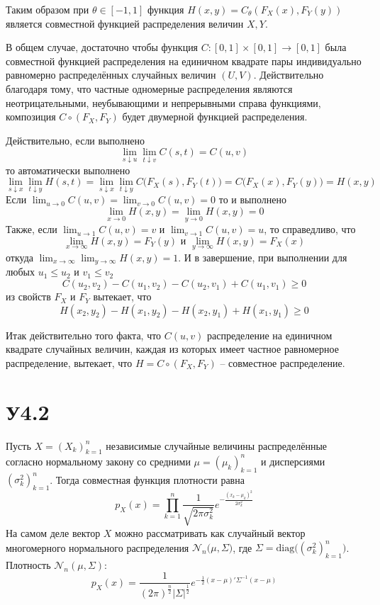 \documentclass[a4paper]{article}
\newcommand{\Ncal}{\mathcal{N}}
\begin{document}
Таким образом при $\theta\in [-1,1]$ функция $H(x,y)=C_\theta(F_X(x),F_Y(y))$
является совместной функцией распределения величин $X,Y$.

В общем случае, достаточно чтобы функция $C:[0,1]\times[0,1]\to[0,1]$ была
совместной функцией распределения на единичном квадрате пары индивидуально
равномерно распределённых случайных величин $(U,V)$. Действительно благодаря
тому, что частные одномерные распределения являются неотрицательными, неубывающими
и непрерывными справа функциями, композиция $C\circ(F_X,F_Y)$ будет двумерной
функцией распределения.

Действительно, если выполнено
\[\lim_{s\downarrow u}\lim_{t\downarrow v} C(s,t) = C(u,v)\]
то автоматически выполнено
\[
\lim_{s\downarrow x}\lim_{t\downarrow y} H(s,t)
= \lim_{s\downarrow x}\lim_{t\downarrow y} C\bigl(F_X(s),F_Y(t)\bigr)
= C\bigl(F_X(x),F_Y(y)\bigr)
= H(x,y)
\]
Если $\lim_{u\to0} C(u,v) = \lim_{v\to0} C(u,v) = 0$ то и выполнено 
\[\lim_{x\to0} H(x,y) = \lim_{y\to0} H(x,y) = 0\]
Также, если $\lim_{u\to1} C(u,v) = v$ и $\lim_{v\to1} C(u,v) = u$, то справедливо,
что
\[\lim_{x\to\infty}H(x,y) = F_Y(y)\text{ и }\lim_{y\to\infty}H(x,y) = F_X(x)\]
откуда $\lim_{x\to\infty}\lim_{y\to\infty}H(x,y) = 1$.
И в завершение, при выполнении для любых $u_1\leq u_2$ и $v_1\leq v_2$
\[C(u_2,v_2) - C(u_1,v_2) - C(u_2,v_1) + C(u_1,v_1)\geq 0\]
из свойств $F_X$ и $F_Y$ вытекает, что
\[H(x_2,y_2) - H(x_1,y_2) - H(x_2,y_1) + H(x_1,y_1)\geq 0\]

Итак действительно того факта, что $C(u,v)$ распределение на единичном квадрате
случайных величин, каждая из которых имеет частное равномерное распределение,
вытекает, что $H=C\circ(F_X,F_Y)$ -- совместное распределение.


\section{У4.2} %
\label{sec:problem_4_2}

Пусть $X=(X_k)_{k=1}^n$ независимые случайные величины распределённые согласно
нормальному закону со средними $\mu = (\mu_k)_{k=1}^n$ и дисперсиями $(\sigma^2_k)_{k=1}^n$.
Тогда совместная функция плотности равна
\[p_X(x) = \prod_{k=1}^n \frac{1}{\sqrt{2\pi \sigma_k^2}} e^{-\frac{(x_k-\mu_k)^2}{2\sigma^2_k}}\]
На самом деле вектор $X$ можно рассматривать как случайный вектор многомерного
нормального распределения $\Ncal_n\bigl(\mu,\Sigma\bigr)$, где
$\Sigma = \text{diag}\bigl((\sigma^2_k)_{k=1}^n\bigr)$.
Плотность $\Ncal_n(\mu,\Sigma)$:
\[
p_X(x)
= \frac{1}{(2\pi)^\frac{n}{2} \lvert \Sigma \rvert^\frac{1}{2}}
	e^{-\frac{1}{2}(x-\mu)'\Sigma^{-1}(x-\mu)}
\]
\end{document}
